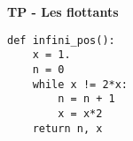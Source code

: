 
\usepackage{tikz-cd} 


\author{Informatique}  %
\title{}  %
\date{Année 2020-2021} %
\renewcommand{\thesection}{\Roman{section}}  %
\pagestyle{fancy}



\fancyfoot[C]{\thepage} %
\fancyfoot[L]{} %
\fancyfoot[R]{} %



\rule[0pt]{0pt}{0pt}
\vspace{0.5cm}
\begin{center}
{\LARGE\bf TP - Les flottants} 
\end{center}
\thispagestyle{empty}
\vskip 1cm
% 
%


\begin{lstlisting}
def infini_pos():
    x = 1.
    n = 0
    while x != 2*x:
        n = n + 1
        x = x*2
    return n, x
\end{lstlisting}

